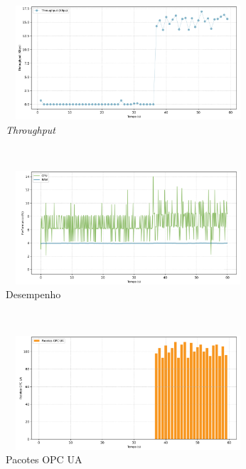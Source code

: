     \begin{figure}[htbp!]
        \centering
        \caption{\label{fig:0-normal-local-server}Gráficos de condição normal de operação - nível de segurança: `None'.}
        \begin{subfigure}[t]{0.5\textwidth}
            \centering
            \caption{\textit{Throughput}}
            \includegraphics[width=1\textwidth, height=120pt]{USPSC-img/output/cropped/0-normal_local_server-tput.png}
        \end{subfigure}%
        ~ 
        \begin{subfigure}[t]{0.5\textwidth}
            \centering
            \caption{Desempenho}
            \includegraphics[width=1\textwidth, height=120pt]{USPSC-img/output/cropped/0-normal_local_server-perf.png}
        \end{subfigure}%
        \\
        \begin{subfigure}[t]{0.5\textwidth}
            \centering
            \caption{Pacotes OPC UA}
            \includegraphics[width=1\textwidth, height=120pt]{USPSC-img/output/cropped/0-normal_local_server-pack.png}
        \end{subfigure}%
        ~
        \begin{subfigure}[t]{0.5\textwidth}

\end{subfigure}
\end{figure}
